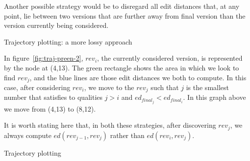 Another possible strategy would be to disregard all edit distances
that, at any point, lie between two versions that are further away
from final version than the version currently being considered.

\begin{floatingfigure}[p]{0.4\textwidth}
  \centering
  \pgfplotsset{width=0.4\textwidth}
  \caption{Trajectory plotting: a more lossy approach}
  \label{fig:traj-preen-2}
\end{floatingfigure}

In figure~\ref{fig:traj-preen-2}, $rev_i$, the currently considered
version, is represented by the node at (4,13). The green rectangle
shows the area in which we look to find $rev_j$, and the blue lines
are those edit distances we both to compute. In this case, after
considering $rev_i$, we move to the $rev_j$ such that $j$ is the
smallest number that satisfies to qualities $j > i$ and $ed_{final_j}
< ed_{final_i}$. In this graph above we move from (4,13) to (8,12).

It is worth stating here that, in both these strategies, after
discovering $rev_j$, we always compute $ed(rev_{j-1}, rev_j)$ rather
than $ed(rev_i,rev_j)$. 

\begin{floatingfigure}[p]{0.4\textwidth}
  \centering
  \pgfplotsset{width=0.4\textwidth}
  \caption{Trajectory plotting}
  \label{fig:traj-preen-3}
\end{floatingfigure}

